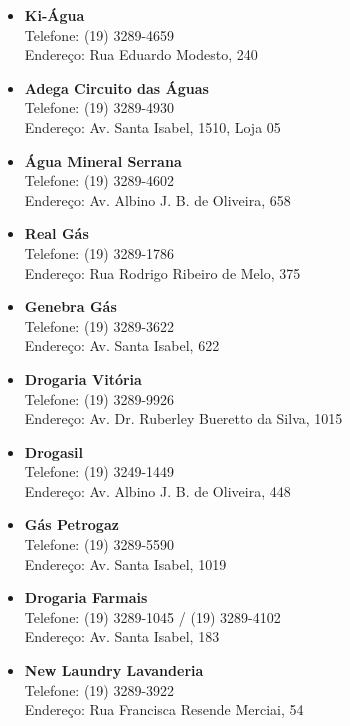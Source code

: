 \begin{itemize}
\item \textbf{Ki-Água}
  \\Telefone: (19) 3289-4659
  \\Endereço: Rua Eduardo Modesto, 240

\item \textbf{Adega Circuito das Águas}
  \\Telefone: (19) 3289-4930
  \\Endereço: Av. Santa Isabel, 1510, Loja 05

\item \textbf{Água Mineral Serrana}
  \\Telefone: (19) 3289-4602
  \\Endereço: Av. Albino J. B. de Oliveira, 658

\item \textbf{Real Gás}
  \\Telefone: (19) 3289-1786
  \\Endereço: Rua Rodrigo Ribeiro de Melo, 375

\item \textbf{Genebra Gás}
  \\Telefone: (19) 3289-3622
  \\Endereço: Av. Santa Isabel, 622

\item \textbf{Drogaria Vitória}
  \\Telefone: (19) 3289-9926
  \\Endereço: Av. Dr. Ruberley Bueretto da Silva, 1015

\item \textbf{Drogasil}
  \\Telefone: (19) 3249-1449
  \\Endereço: Av. Albino J. B. de Oliveira, 448

\item \textbf{Gás Petrogaz}
  \\Telefone: (19) 3289-5590
  \\Endereço: Av. Santa Isabel, 1019

\item \textbf{Drogaria Farmais}
  \\Telefone: (19) 3289-1045 / (19) 3289-4102
  \\Endereço: Av. Santa Isabel, 183

\item \textbf{New Laundry Lavanderia}
  \\Telefone: (19) 3289-3922
  \\Endereço: Rua Francisca Resende Merciai, 54


\end{itemize}
